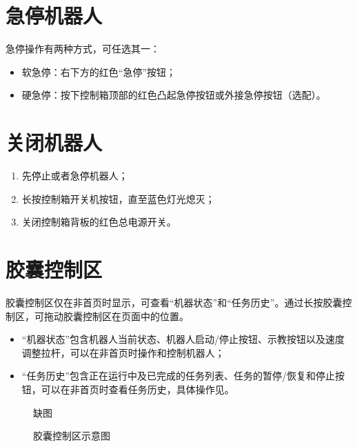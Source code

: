 \section{急停机器人}

急停操作有两种方式，可任选其一：
\begin{itemize}
	\item 软急停：\LM 右下方的红色“急停”按钮；
	\item 硬急停：按下控制箱顶部的红色凸起急停按钮或外接急停按钮（选配）。
\end{itemize}


\section{关闭机器人}
\begin{enumerate}
	\item 先停止或者急停机器人；
	\item 长按控制箱开关机按钮，直至蓝色灯光熄灭；
	\item 关闭控制箱背板的红色总电源开关。
\end{enumerate}


\section{胶囊控制区}
胶囊控制区仅在非首页时显示，可查看“机器状态”和“任务历史”。通过长按胶囊控制区，可拖动胶囊控制区在页面中的位置。
\begin{itemize}
	\item “机器状态”包含机器人当前状态、机器人启动/停止按钮、示教按钮以及速度调整拉杆，可以在非首页时操作和控制机器人；
	\item “任务历史”包含正在运行中及已完成的任务列表、任务的暂停/恢复和停止按钮，可以在非首页时查看任务历史，具体操作见。
\end{itemize}

\begin{figure}[ht]
	\centering
	\color{red}缺图
	\caption{胶囊控制区示意图}
	\label{fig:胶囊控制区示意图}
\end{figure}
